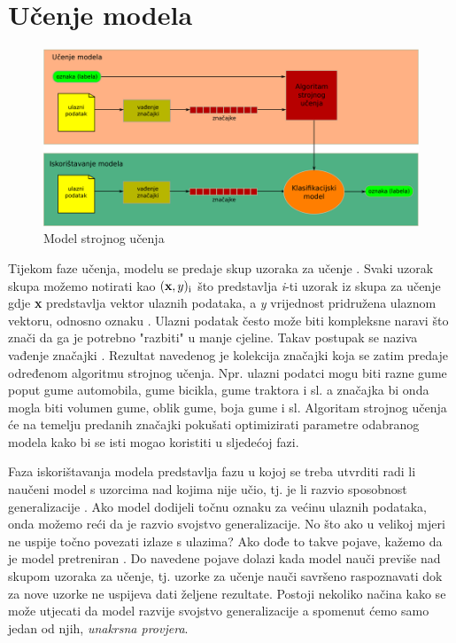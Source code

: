 \documentclass[times, utf8, zavrsni]{fer}
\begin{document}
\section{Učenje modela}

\begin{figure}[H]
    \centering
    \includegraphics[scale=0.5]{img/supervised-learning-flow.png}
    \caption[Caption for LOF]{Model strojnog učenja\footnotemark}
    \label{fig:supervised-learning-flow}
\end{figure}

Tijekom faze učenja, modelu se predaje skup uzoraka za učenje . Svaki uzorak skupa možemo notirati kao $(\textbf{x}, y)\textsubscript{i}$ što predstavlja \textit{i}-ti uzorak iz skupa za učenje gdje \textbf{x} predstavlja vektor ulaznih podataka, a \textit{y} vrijednost pridružena ulaznom vektoru, odnosno oznaku . Ulazni podatak često može biti kompleksne naravi što znači da ga je potrebno "razbiti" u manje cjeline. Takav postupak se naziva vađenje značajki . Rezultat navedenog je kolekcija značajki koja se zatim predaje određenom algoritmu strojnog učenja. Npr. ulazni podatci mogu biti razne gume poput gume automobila, gume bicikla, gume traktora i sl. a značajka bi onda mogla biti volumen gume, oblik gume, boja gume i sl. Algoritam strojnog učenja će na temelju predanih značajki pokušati optimizirati parametre odabranog modela kako bi se isti mogao koristiti u sljedećoj fazi.


Faza iskorištavanja modela predstavlja fazu u kojoj se treba utvrditi radi li naučeni model s uzorcima nad kojima nije učio, tj. je li razvio sposobnost generalizacije . Ako model dodijeli točnu oznaku za većinu ulaznih podataka, onda možemo reći da je razvio svojstvo generalizacije. No što ako u velikoj mjeri ne uspije točno povezati izlaze s ulazima? Ako dođe to takve pojave, kažemo da je model pretreniran . Do navedene pojave dolazi kada model nauči previše nad skupom uzoraka za učenje, tj. uzorke za učenje nauči savršeno raspoznavati dok za nove uzorke ne uspijeva dati željene rezultate. Postoji nekoliko načina kako se može utjecati da model razvije svojstvo generalizacije a spomenut ćemo samo jedan od njih, \textit{unakrsna provjera}.
\end{document}
